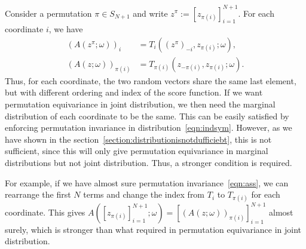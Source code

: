 \documentclass{article}
\newcommand{\oo}[1]{\left( #1 \right)}
\newcommand{\cc}[1]{\left[ #1 \right]}
\begin{document}
        Consider a permutation $\pi\in S_{N+1}$ and write $z^\pi:=\cc{z_{\pi(i)}}_{i=1}^{N+1}$. For each coordinate $i$, we have
        \begin{align*}
            \oo{A\left(z^\pi; \omega\right)}_i
            &= T_i\left(\oo{z^\pi}_{-i},z_{\pi(i)};\omega\right),\\
            \oo{A\left(z; \omega\right)}_{\pi(i)}
            &= T_{\pi(i)}\left(z_{-\pi(i)},z_{\pi(i)};\omega\right).
        \end{align*}
        Thus, for each coordinate, the two random vectors share the same last element, but with different ordering and index of the score function. If we want permutation equivariance in joint distribution, we then need the marginal distribution of each coordinate to be the same.
        This can be easily satisfied by enforcing permutation invariance in distribution~\ref{eqn:indsym}. However, as we have shown in the section~\ref{section:distributionisnotdufficiebt}, this is not sufficient, since this will only give permutation equivariance in marginal distributions but not joint distribution. Thus, a stronger condition is required.

        For example, if we have almost sure permutation invariance~\ref{eqn:ass}, we can rearrange the first $N$ terms and change the index from $T_i$ to $T_{\pi(i)}$ for each coordinate. This gives $A\left(\left[z_{\pi(i)}\right]_{i=1}^{N+1}; \omega\right) = \left[(A(z; \omega))_{\pi(i)}\right]_{i=1}^{N+1}$ almost surely, which is stronger than what required in permutation equivariance in joint distribution.
\end{document}
